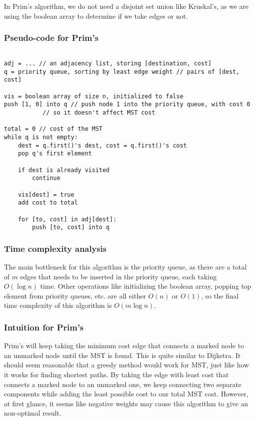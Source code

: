 \documentclass{article}
\begin{document}
In Prim's algorithm, we do not need a disjoint set union like Kruskal's, as we are using the boolean array to determine if we take edges or not.

\subsubsection{Pseudo-code for Prim's}

\begin{lstlisting}

adj = ... // an adjacency list, storing [destination, cost]
q = priority queue, sorting by least edge weight // pairs of [dest, cost]

vis = boolean array of size n, initialized to false
push [1, 0] into q // push node 1 into the priority queue, with cost 0 
		   // so it doesn't affect MST cost

total = 0 // cost of the MST
while q is not empty:
	dest = q.first()'s dest, cost = q.first()'s cost
	pop q's first element
	
	if dest is already visited
		continue
		
	vis[dest] = true
	add cost to total
	
	for [to, cost] in adj[dest]:
		push [to, cost] into q
\end{lstlisting}

\subsubsection{Time complexity analysis}
The main bottleneck for this algorithm is the priority queue, as there are a total of $m$ edges that needs to be inserted in the priority queue, each taking $O(\log n)$ time. Other operations like initializing the boolean array, popping top element from priority queues, etc. are all either $O(n)$ or $O(1)$, so the final time complexity of this algorithm is $O(m\log n)$.

\subsubsection{Intuition for Prim's}
Prim's will keep taking the minimum cost edge that connects a marked node to an unmarked node until the MST is found. This is quite similar to Dijkstra. It should seem reasonable that a greedy method would work for MST, just like how it works for finding shortest paths. By taking the edge with least cost that connects a marked node to an unmarked one, we keep connecting two separate components while adding the least possible cost to our total MST cost. However, at first glance, it seems like negative weights may cause this algorithm to give an non-optimal result.
\end{document}
